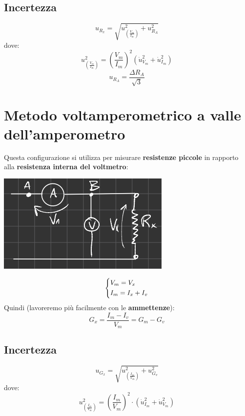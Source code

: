 \subsection{Incertezza}
\begin{equation*}
    u_{R_x} = \sqrt{u^2_{\left(\frac{V_m}{I_m}\right)} + u^2_{R_A}} 
\end{equation*}
dove:
\begin{equation*}
    u^2_{\left(\frac{V_m}{I_m}\right)} ={\left(\frac{V_m}{I_m}\right)}^2\left(\dot{u}^2_{V_m} + \dot{u}^2_{I_m} \right)
\end{equation*}
\begin{equation*}
    u_{R_A} = \frac{\Delta R_A}{\sqrt{3}}
\end{equation*}

\section{Metodo voltamperometrico a valle dell'amperometro}
Questa configurazione si utilizza per misurare \textbf{resistenze piccole} in rapporto alla \textbf{resistenza interna del voltmetro}:
\begin{center}
    \includegraphics[width=.4\textwidth]{Images/figure4.png}
\end{center}
\begin{equation*}
    \begin{dcases}
        V_m = V_x\\
        I_m = I_x + I_v
    \end{dcases}
\end{equation*}
Quindi (lavoreremo più facilmente con le \textbf{ammettenze}):
\begin{equation*}
    G_x = \frac{I_m - I_v}{V_m} = G_m - G_v
\end{equation*}
\subsection{Incertezza}
\begin{equation*}
    u_{G_x} = \sqrt{u^2_{\left(\frac{I_m}{V_m}\right)} + u^2_{G_v}}
\end{equation*}
dove:
\begin{equation*}
   u^2_{\left(\frac{I_m}{V_m}\right)}=  \left(\frac{I_m}{V_m}\right)^2 \cdot \left(\dot{u}^2_{I_m} + \dot{u}^2_{V_m} \right)
\end{equation*}